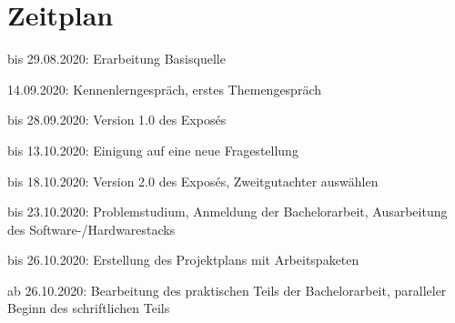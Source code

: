 \documentclass[11pt]{article}
\newcommand{\cmark}{\ding{51}}%
\newcommand{\done}{\rlap{$\square$}{\raisebox{2pt}{\large\hspace{1pt}\cmark}}%
\hspace{-2.5pt}}
\begin{document}
    \section{Zeitplan}
    \begin{todolist}
        \item[\done] bis 29.08.2020: Erarbeitung Basisquelle
        \item[\done] 14.09.2020: Kennenlerngespräch, erstes Themengespräch
        \item[\done] bis 28.09.2020: Version 1.0 des Exposés
        \item[\done] bis 13.10.2020: Einigung auf eine neue Fragestellung
        \item[\done] bis 18.10.2020: Version 2.0 des Exposés, Zweitgutachter auswählen
        \item bis 23.10.2020: Problemstudium, Anmeldung der Bachelorarbeit, Ausarbeitung des Software-/Hardwarestacks
        \item bis 26.10.2020: Erstellung des Projektplans mit Arbeitspaketen
        \item ab 26.10.2020: Bearbeitung des praktischen Teils der Bachelorarbeit, paralleler Beginn des schriftlichen Teils
    \end{todolist}

    \listoffigures

    ~\nocite{*}
    
    
\end{document}
